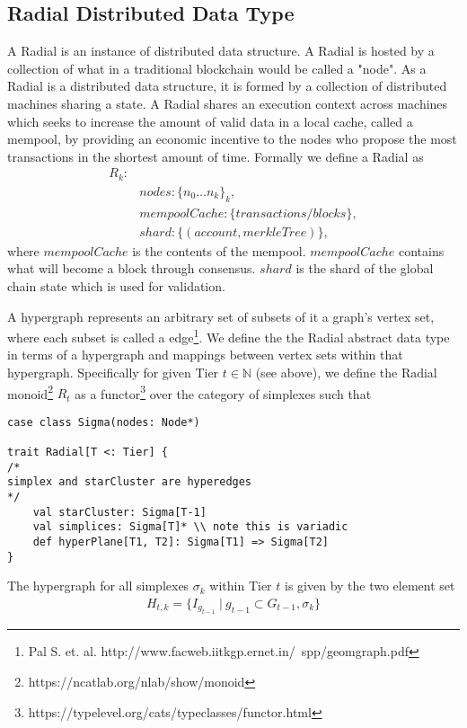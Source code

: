 \documentclass{article}
\begin{document}
\subsection{Radial Distributed Data Type}
A Radial is an instance of distributed data structure. A Radial is hosted by a collection of what in a traditional blockchain would be called a "node".  As a Radial is a distributed data structure, it is formed by a collection of distributed machines sharing a state. A Radial shares an execution context across machines which seeks to increase the amount of valid data in a local cache, called a mempool, by providing an economic incentive to the nodes who propose the most transactions in the shortest amount of time. Formally we define a Radial as 
\begin{align*}
R_k: \\ &
nodes: \{n_0 \dots n_k\}_k, \\ &
mempoolCache: \{transactions/blocks\}, \\ &
shard: \{(account, merkleTree)\}, 
\end{align*}
where $mempoolCache$ is the contents of the mempool. $mempoolCache$ contains what will become a block through consensus. $shard$ is the shard of the global chain state which is used for validation. 

A hypergraph represents an arbitrary set of subsets of it a graph's vertex set, where each subset is called a edge\footnote{Pal S. et. al. http://www.facweb.iitkgp.ernet.in/~spp/geomgraph.pdf}. We define the the Radial abstract data type in terms of a hypergraph and mappings between vertex sets within that hypergraph. Specifically for given Tier $t \in \mathbb{N}$ (see above), we define the Radial monoid\footnote{https://ncatlab.org/nlab/show/monoid} $R_t$ as a functor\footnote{https://typelevel.org/cats/typeclasses/functor.html} over the category of simplexes such that

\begin{lstlisting}
case class Sigma(nodes: Node*)

trait Radial[T <: Tier] {
/*
simplex and starCluster are hyperedges
*/
	val starCluster: Sigma[T-1]
	val simplices: Sigma[T]* \\ note this is variadic
	def hyperPlane[T1, T2]: Sigma[T1] => Sigma[T2]
}
\end{lstlisting}

The hypergraph for all simplexes $\sigma_k$ within Tier $t$ is given by the two element set
\begin{equation} \label{eq1}
\begin{split}
H_{t,k} = \{I_{g_{t-1}} \ | \ g_{t-1} \subset G_{t-1}, \sigma_k \}
\end{split}
\end{equation}
\end{document}
